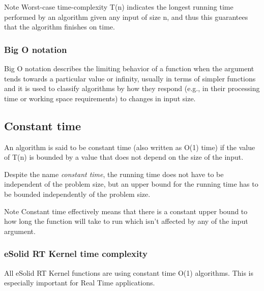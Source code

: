 \begin{DoxyNote}{Note}
Worst-\/case time-\/complexity {\ttfamily T(n)} indicates the longest running time performed by an algorithm given any input of size {\ttfamily n}, and thus this guarantees that the algorithm finishes on time.
\end{DoxyNote}
\hypertarget{time_complexity_tc_big_o}{}\subsubsection{Big O notation}\label{time_complexity_tc_big_o}
Big O notation describes the limiting behavior of a function when the argument tends towards a particular value or infinity, usually in terms of simpler functions and it is used to classify algorithms by how they respond (e.\-g., in their processing time or working space requirements) to changes in input size.\hypertarget{time_complexity_tc_constant_time}{}\subsection{Constant time}\label{time_complexity_tc_constant_time}
An algorithm is said to be constant time (also written as {\ttfamily O(1)} time) if the value of {\ttfamily T(n)} is bounded by a value that does not depend on the size of the input.

Despite the name {\itshape constant time}, the running time does not have to be independent of the problem size, but an upper bound for the running time has to be bounded independently of the problem size.

\begin{DoxyNote}{Note}
Constant time effectively means that there is a constant upper bound to how long the function will take to run which isn’t affected by any of the input argument.
\end{DoxyNote}
\hypertarget{time_complexity_tc_esolid}{}\subsubsection{e\-Solid R\-T Kernel time complexity}\label{time_complexity_tc_esolid}
All e\-Solid R\-T Kernel functions are using {\ttfamily constant time O(1)} algorithms. This is especially important for Real Time applications. 